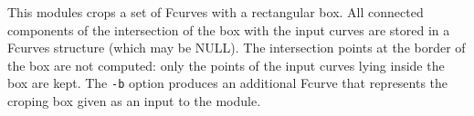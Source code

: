 This modules crops a set of Fcurves with a rectangular box. All connected
components of the intersection of the box with the input curves are
stored in a Fcurves structure (which may be NULL). 
The intersection points at the border
of the box are not computed: only the points of the
input curves lying inside the box are kept.
The \verb+-b+ option produces an additional Fcurve that represents 
the croping box given as an input to the module.
